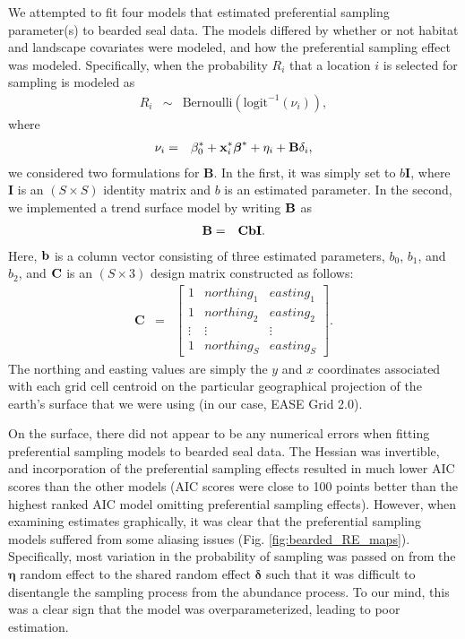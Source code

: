 \documentclass[times,mee,doublespace,]{besauth2}
\begin{document}
\begin{flushleft}

We attempted to fit four models that estimated preferential sampling parameter(s) to bearded seal data.  The models differed by whether or not habitat and landscape covariates were modeled, and how the preferential sampling effect was modeled.  Specifically, when the probability $R_i$ that a location $i$ is selected for sampling is modeled as
\begin{eqnarray}
 \label{eq:R}
  R_i & \sim & \text{Bernoulli}(\textrm{logit}^{-1}(\nu_i)),
\end{eqnarray}
where
\begin{eqnarray}
  \label{eq:nu}
  \nu_i & = & \beta_0^* + {\bf x}_i^* \boldsymbol{\beta}^*+\eta_i+{\bf B} \delta_i,
\label{eq:nu}
\end{eqnarray}
we considered two formulations for \textbf{B}.  In the first, it was simply set to $b \textbf{I}$, where $\textbf{I}$ is an $(S \times S)$ identity matrix and $b$ is an estimated parameter.  In the second, we implemented a trend surface model by writing $\bf{B}$ as
\begin{eqnarray}
  \label{eq:B}
  \textbf{B} & = & {\bf C}{\bf b} \textbf{I}.
\end{eqnarray}
Here, ${\bf b}$ is a column vector consisting of three estimated parameters, $b_0$, $b_1$, and $b_2$, and ${\bf C}$ is an $(S \times 3)$ design matrix constructed as follows:
\begin{eqnarray}
  \textbf{C} & = & \left[
    \begin{array}{ccc}
    1 & northing_1 & easting_1 \\
    1 & northing_2 & easting_2 \\
    \vdots & \vdots & \vdots \\
    1 & northing_S & easting_S
    \end{array}
  \right].
\end{eqnarray}
The northing and easting values are simply the $y$ and $x$ coordinates associated with each grid cell centroid on the particular geographical projection of the earth's surface that we were using (in our case, EASE Grid 2.0).

\hspace{0.5in} On the surface, there did not appear to be any numerical errors when fitting preferential sampling models to bearded seal data.  The Hessian was invertible, and incorporation of the preferential sampling effects resulted in much lower AIC scores than the other models (AIC scores were close to 100 points better than the highest ranked AIC model omitting preferential sampling effects).  However, when examining estimates graphically, it was clear that the preferential sampling models suffered from some aliasing issues (Fig. \ref{fig:bearded_RE_maps}).  Specifically, most variation in the probability of sampling was passed on from the $\boldsymbol{\eta}$ random effect to the shared random effect $\boldsymbol{\delta}$ such that it was difficult to disentangle the sampling process from the abundance process.  To our mind, this was a clear sign that the model was overparameterized, leading to poor estimation.


\end{flushleft}
\end{document}
